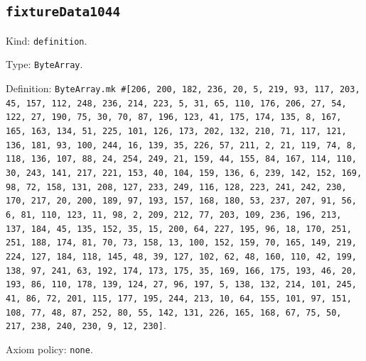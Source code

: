 \documentclass[11pt]{article}
\begin{document}
\subsection*{\texttt{fixtureData1044}}
\noindent Kind: \texttt{definition}.\par
\noindent Type: \texttt{ByteArray}.\par
\noindent Definition: \texttt{ByteArray.mk \#[206, 200, 182, 236, 20, 5, 219, 93, 117, 203, 45, 157, 112, 248, 236, 214, 223, 5, 31, 65, 110, 176, 206, 27, 54, 122, 27, 190, 75, 30, 70, 87, 196, 123, 41, 175, 174, 135, 8, 167, 165, 163, 134, 51, 225, 101, 126, 173, 202, 132, 210, 71, 117, 121, 136, 181, 93, 100, 244, 16, 139, 35, 226, 57, 211, 2, 21, 119, 74, 8, 118, 136, 107, 88, 24, 254, 249, 21, 159, 44, 155, 84, 167, 114, 110, 30, 243, 141, 217, 221, 153, 40, 104, 159, 136, 6, 239, 142, 152, 169, 98, 72, 158, 131, 208, 127, 233, 249, 116, 128, 223, 241, 242, 230, 170, 217, 20, 200, 189, 97, 193, 157, 168, 180, 53, 237, 207, 91, 56, 6, 81, 110, 123, 11, 98, 2, 209, 212, 77, 203, 109, 236, 196, 213, 137, 184, 45, 135, 152, 35, 15, 200, 64, 227, 195, 96, 18, 170, 251, 251, 188, 174, 81, 70, 73, 158, 13, 100, 152, 159, 70, 165, 149, 219, 224, 127, 184, 118, 145, 48, 39, 127, 102, 62, 48, 160, 110, 42, 199, 138, 97, 241, 63, 192, 174, 173, 175, 35, 169, 166, 175, 193, 46, 20, 193, 86, 110, 178, 139, 124, 27, 96, 197, 5, 138, 132, 214, 101, 245, 41, 86, 72, 201, 115, 177, 195, 244, 213, 10, 64, 155, 101, 97, 151, 108, 77, 48, 87, 252, 80, 55, 142, 131, 226, 165, 168, 67, 75, 50, 217, 238, 240, 230, 9, 12, 230]}.\par
\noindent Axiom policy: \texttt{none}.\par
\end{document}
